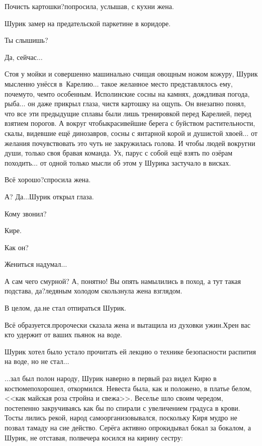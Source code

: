 {\diagdash Почисть картошки?\mdash попросила, услышав, с кухни жена.

Шурик замер на предательской паркетине в коридоре.

\diagdash Ты слышишь?

\diagdash Да, сейчас$\ldots$

Стоя у мойки и совершенно машинально счищая овощным ножом кожуру, Шурик мысленно унёсся в~Карелию$\ldots$ такое желанное место представлялось ему, почему\sdash то, чем\sdash то особенным. Исполинские сосны на камнях, дождливая погода, рыба$\ldots$ он даже прикрыл глаза, чистя картошку на ощупь. Он внезапно понял, что все эти предыдущие сплавы были лишь тренировкой перед Карелией, перед взятием порогов. А вокруг чтобы\mdash красивейшие берега с буйством растительности, скалы, видевшие ещё динозавров, сосны с янтарной корой и душистой хвоей$\ldots$ от желания почувствовать это чуть не закружилась голова. И чтобы людей вокруг\mdash ни души, только своя бравая команда. Ух, парус с собой ещё взять по озёрам походить$\ldots$ от одной только мысли об этом у Шурика застучало в висках.

\diagdash Всё хорошо?\mdash спросила жена.

\diagdash А? Да$\ldots$\mdash Шурик открыл глаза.

\diagdash Кому звонил?

\diagdash Кире.

\diagdash Как он? 

\diagdash Жениться надумал$\ldots$ 

\diagdash А сам чего смурной? А, понятно! Вы опять намылились в поход, а тут такая подстава, да?\mdash ледяным холодом скользнула жена взглядом.

\diagdash В целом, да.\mdash не стал отпираться Шурик.

\diagdash Всё образуется.\mdash пророчески сказала жена и вытащила из духовки ужин.\mdash Хрен вас кто удержит от ваших пьянок на воде.

Шурик хотел было устало прочитать ей лекцию о технике безопасности распития на воде, но не стал$\ldots$ 

\vspace{0.5cm}

$\ldots$зал был полон народу, Шурик наверно в первый раз видел Кирю в костюме\mdash похорошел, откормился. Невеста была, как и положено, в платье белом, <<как майская роза стройна и свежа>>. Веселье шло своим чередом, постепенно закручиваясь как бы по спирали с увеличением градуса в крови. Тосты лились рекой, народ самоорганизовывался, поскольку Киря мудро не позвал тамаду на сие действо. Серёга активно опрокидывал бокал за бокалом, а Шурик, не отставая, полвечера косился на кирину сестру:

}
